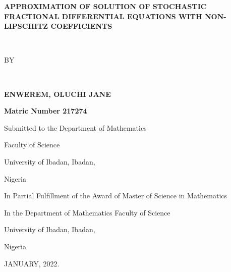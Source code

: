 \documentclass[a4 paper, 12pt]{report}
\theoremstyle{plain}
\begin{document}
	 \baselineskip 29pt
\newcommand{\disp}{\displaystyle}
\thispagestyle{empty}




\begin{center}
	\textbf{\large{APPROXIMATION OF SOLUTION OF STOCHASTIC FRACTIONAL DIFFERENTIAL EQUATIONS WITH NON-LIPSCHITZ  COEFFICIENTS}}
\end{center}
\ \
\begin{center}
	
	BY
\end{center}
\ \
\begin{center}
	\textbf{\large{ENWEREM, OLUCHI JANE}}
\end{center}
\begin{center}
	\textbf{Matric Number 217274}
\end{center}
\begin{center}
	Submitted to the Department of  Mathematics
\end{center}
\begin{center}
	Faculty of Science  
\end{center}
\begin{center}
	University of Ibadan, Ibadan,  
\end{center}
\begin{center}
	Nigeria  
\end{center}
\begin{center}
	In Partial Fulfillment of the Award of Master of Science in Mathematics
\end{center}
\begin{center}
	In the Department of Mathematics Faculty of Science
\end{center}
\begin{center}
	University of Ibadan, Ibadan,  
\end{center}
\begin{center}
	Nigeria  
\end{center}

\begin{center}
JANUARY, 2022.
\end{center}
\end{document}
